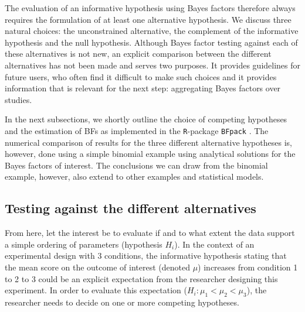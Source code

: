 \documentclass[11pt,reqno]{article}
\begin{document}
The evaluation of an informative hypothesis using Bayes factors therefore always requires the formulation of at least one alternative hypothesis. We discuss three natural choices: the unconstrained alternative, the complement of the informative hypothesis and the null hypothesis. Although Bayes factor testing against each of these alternatives is not new, an explicit comparison between the different alternatives has not been made and serves two purposes. It provides guidelines for future users, who often find it difficult to make such choices and it provides information that is relevant for the next step: aggregating Bayes factors over studies.

In the next subsections, we shortly outline the choice of competing hypotheses and the estimation of BFs as implemented in the \texttt{R}-package \texttt{BFpack} \citep{BFpack}. The numerical comparison of results for the three different alternative hypotheses is, however, done using a simple binomial example using analytical solutions for the Bayes factors of interest. The conclusions we can draw from the binomial example, however, also extend to other examples and statistical models.




\subsection{Testing against the different alternatives}

From here, let the interest be to evaluate if and to what extent the data support a simple ordering of parameters (hypothesis $H_i$). In the context of an experimental design with 3 conditions, the informative hypothesis stating that the mean score on the outcome of interest (denoted $\mu$) increases from condition 1 to 2 to 3 could be an explicit expectation from the researcher designing this experiment. In order to evaluate this expectation ($H_i: \mu_1 < \mu_2 < \mu_3$), the researcher needs to decide on one or more competing hypotheses.
\end{document}
